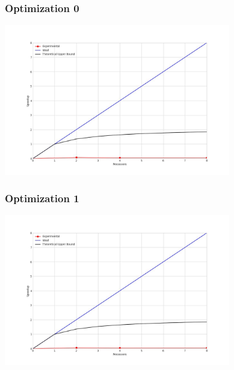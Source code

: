\subsubsection{Optimization 0}
\begin{center}
    \resizebox{0.8\textwidth}{!}{}
    \includegraphics[width=0.74\textwidth]{../img/speedup-graph_type-tile-205000-O0}
\end{center}

\subsubsection{Optimization 1}
\begin{center}
    \resizebox{0.8\textwidth}{!}{}
    \includegraphics[width=0.74\textwidth]{../img/speedup-graph_type-tile-205000-O1}
\end{center}

\clearpage
